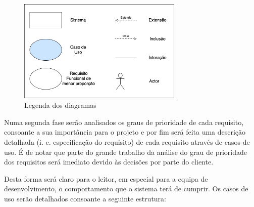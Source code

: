 \begin{figure}[ht!]
	\begin{center}
		\includegraphics[width=0.7\textwidth]{img/rf/legenda}
		\caption{Legenda dos diagramas}
		\label{fig:rf-legenda}
	\end{center}
\end{figure}

Numa segunda fase serão analisados os graus de prioridade de cada requisito, consoante a sua importância para o projeto e por fim será feita uma descrição detalhada (i. e. especificação do requisito) de cada requisito através de casos de uso. É de notar que parte do grande trabalho da análise do grau de prioridade dos requisitos será imediato devido às decisões por parte do cliente.

Desta forma será claro para o leitor, em especial para a equipa de desenvolvimento, o comportamento que o sistema terá de cumprir. Os casos de uso serão detalhados consoante a seguinte estrutura:

